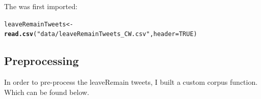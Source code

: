\documentclass[10pt  ,usenames, dvipsnames]{article}\usepackage[]{graphicx}\usepackage[]{color}
\makeatletter
\newcommand{\hlnum}[1]{\textcolor[rgb]{0.686,0.059,0.569}{#1}}%
\newcommand{\hlstr}[1]{\textcolor[rgb]{0.192,0.494,0.8}{#1}}%
\newcommand{\hlstd}[1]{\textcolor[rgb]{0.345,0.345,0.345}{#1}}%
\newcommand{\hlkwb}[1]{\textcolor[rgb]{0.69,0.353,0.396}{#1}}%
\newcommand{\hlkwc}[1]{\textcolor[rgb]{0.333,0.667,0.333}{#1}}%
\newcommand{\hlkwd}[1]{\textcolor[rgb]{0.737,0.353,0.396}{\textbf{#1}}}%
\newenvironment{kframe}{%
 \def\at@end@of@kframe{}%
 \ifinner\ifhmode%
  \def\at@end@of@kframe{\end{minipage}}%
  \begin{minipage}{\columnwidth}%
 \fi\fi%
 \def\FrameCommand##1{\hskip\@totalleftmargin \hskip-\fboxsep
 \colorbox{shadecolor}{##1}\hskip-\fboxsep
     \hskip-\linewidth \hskip-\@totalleftmargin \hskip\columnwidth}%
 \MakeFramed {\advance\hsize-\width
   \@totalleftmargin\z@ \linewidth\hsize
   \@setminipage}}%
 {\par\unskip\endMakeFramed%
 \at@end@of@kframe}
\newenvironment{knitrout}{}{} %
\makeatother
\begin{document}
The was first imported:
\begin{knitrout}
\color{fgcolor}\begin{kframe}
\begin{alltt}
\hlstd{leaveRemainTweets} \hlkwb{<-} \hlkwd{read.csv}\hlstd{(}\hlstr{"data/leaveRemainTweets_CW.csv"}\hlstd{,} \hlkwc{header}\hlstd{=}\hlnum{TRUE}\hlstd{)}
\end{alltt}
\end{kframe}
\end{knitrout}

\subsection{Preprocessing}

In order to pre-process the leaveRemain tweets, I built a custom corpus function. Which can be found below.
\end{document}
